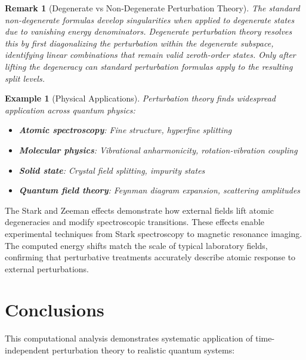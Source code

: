 \documentclass[a4paper, 11pt]{article}
\newtheorem{example}{Example}[section]
\newtheorem{remark}{Remark}[section]
\begin{document}
\begin{remark}[Degenerate vs Non-Degenerate Perturbation Theory]
The standard non-degenerate formulas develop singularities when applied to
degenerate states due to vanishing energy denominators. Degenerate perturbation
theory resolves this by first diagonalizing the perturbation within the
degenerate subspace, identifying linear combinations that remain valid
zeroth-order states. Only after lifting the degeneracy can standard
perturbation formulas apply to the resulting split levels.
\end{remark}

\begin{example}[Physical Applications]
Perturbation theory finds widespread application across quantum physics:
\begin{itemize}
\item \textbf{Atomic spectroscopy}: Fine structure, hyperfine splitting
\item \textbf{Molecular physics}: Vibrational anharmonicity, rotation-vibration coupling
\item \textbf{Solid state}: Crystal field splitting, impurity states
\item \textbf{Quantum field theory}: Feynman diagram expansion, scattering amplitudes
\end{itemize}
\end{example}

The Stark and Zeeman effects demonstrate how external fields lift atomic
degeneracies and modify spectroscopic transitions. These effects enable
experimental techniques from Stark spectroscopy to magnetic resonance imaging.
The computed energy shifts match the scale of typical laboratory fields,
confirming that perturbative treatments accurately describe atomic response
to external perturbations.

\section{Conclusions}

This computational analysis demonstrates systematic application of time-independent
perturbation theory to realistic quantum systems:
\end{document}

